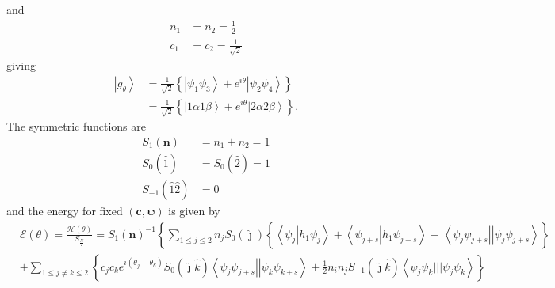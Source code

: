\documentclass[aps,preprint]{revtex4}%
\begin{document}
and%
\begin{align*}
n_{1}  &  =n_{2}=\frac{1}{2}\\
c_{1}  &  =c_{2}=\frac{1}{\sqrt{2}}%
\end{align*}
giving%
\begin{align*}
\left\vert g_{\theta}\right\rangle  &  =\frac{1}{\sqrt{2}}\left\{  \left\vert
\psi_{1}\psi_{3}\right\rangle +e^{i\theta}\left\vert \psi_{2}\psi
_{4}\right\rangle \right\} \\
&  =\frac{1}{\sqrt{2}}\left\{  \left\vert 1\alpha1\beta\right\rangle
+e^{i\theta}\left\vert 2\alpha2\beta\right\rangle \right\}  .
\end{align*}
The symmetric functions are
\begin{align*}
S_{1}\left(  \mathbf{n}\right)   &  =n_{1}+n_{2}=1\\
S_{0}\left(  \hat{1}\right)   &  =S_{0}\left(  \hat{2}\right)  =1\\
S_{-1}\left(  \hat{1}\hat{2}\right)   &  =0
\end{align*}
and the energy for fixed $\left(  \mathbf{c,\psi}\right)  $ is given by%
\begin{align*}
&  \mathcal{E}\left(  \theta\right)  =\frac{\mathcal{H}\left(  \theta\right)
}{S_{\frac{N}{2}}}=S_{1}\left(  \mathbf{n}\right)  ^{-1}\left\{  \sum_{1\leq
j\leq2}n_{j}S_{0}\left(  \hat{\jmath}\right)  \left\{  \overset{}{\left\langle
\psi_{j}\left\vert h_{1}\psi_{j}\right.  \right\rangle +\left\langle
\psi_{j+s}\left\vert h_{1}\psi_{j+s}\right.  \right\rangle }+\,\left\langle
\psi_{j}\psi_{j+s}\right\vert \left\vert \psi_{j}\psi_{j+s}\right\rangle
\right\}  \right. \\
&  +\sum_{1\leq j\neq k\leq2}\left\{  c_{j}c_{k}e^{i\left(  \theta_{j}%
-\theta_{k}\right)  }S_{0}\left(  \hat{\jmath}\hat{k}\right)  \left\langle
\psi_{j}\psi_{j+s}\right\vert \left\vert \psi_{k}\psi_{k+s}\right\rangle
+\frac{1}{2}\overset{}{n_{i}n_{j}S_{-1}\left(  \hat{\jmath}\hat{k}\right)
\left\langle \psi_{j}\psi_{k}|||\psi_{j}\psi_{k}\right\rangle }\right\}
\end{align*}%
\end{document}
